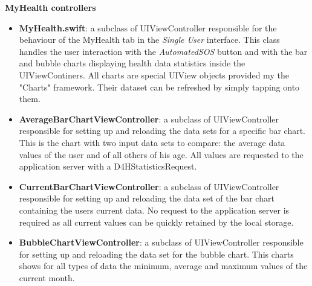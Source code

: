 \documentclass[titlepage]{article}
\begin{document}
{		{\bf MyHealth controllers}
		\begin{itemize}
			\item {\bf MyHealth.swift}: a subclass of UIViewController responsible for the behaviour of the MyHealth tab in the {\it {\it Single User}} interface. This class handles the user interaction with the {\it AutomatedSOS} button and with the bar and bubble charts displaying health data statistics inside the UIViewContiners. All charts are special UIView objects provided my the "Charts" framework. Their dataset can be refreshed by simply tapping onto them.
			\item {\bf AverageBarChartViewController}: a subclass of UIViewController responsible for setting up and reloading the data sets for a specific bar chart. This is the chart with two input data sets to compare: the average data values of the user and of all others of his age. All values are requested to the application server with a D4HStatisticsRequest.
			\item {\bf CurrentBarChartViewController}: a subclass of UIViewController responsible for setting up and reloading the data set of the bar chart containing the user\textsc{}s current data. No request to the application server is required as all current values can be quickly retained by the local storage.
			\item {\bf BubbleChartViewController}: a subclass of UIViewController responsible for setting up and reloading the data set for the bubble chart. This charts shows for all types of data the minimum, average and maximum values of the current month.
			
		\end{itemize}
		
}
\end{document}
